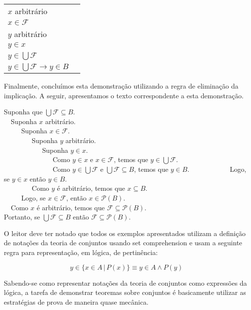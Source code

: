 \begin{Example}
\begin{flushleft}
\begin{tabular}{ll}
$x$ arbitrário & \\
$x\in\mathcal{F}$ & \\
$y$ arbitrário & \\
$y\in x$ & \\
$y\in\bigcup\mathcal{F}$ &\\
$y\in \bigcup \mathcal{F} \to y\in B$ & \\
\end{tabular}
\end{flushleft}
Finalmente, concluímos esta demonstração utilizando a regra de
eliminação da implicação. A seguir, apresentamos o texto
correspondente a esta demonstração.
\begin{flushleft}
Suponha que $\bigcup\mathcal{F}\subseteq B$.\\
\verb|  |Suponha $x$ arbitrário.\\
\verb|     |Suponha $x\in\mathcal{F}$.\\
\verb|        |Suponha $y$ arbitrário.\\
\verb|           |Suponha $y\in x$.\\
\verb|              |Como $y\in x$ e $x\in\mathcal{F}$, temos que
$y\in\bigcup\mathcal{F}$.\\
\verb|              |Como $y\in\bigcup\mathcal{F}$ e
$\bigcup\mathcal{F}\subseteq B$, temos que $y\in B$.
\verb|           |Logo, se $y\in x$ então $y\in B$.\\
\verb|        |Como $y$ é arbitrário, temos que $x\subseteq B$.\\
\verb|     |Logo, se $x\in\mathcal{F}$, então $x\in\mathcal{P}(B)$.\\
\verb|  |Como $x$ é arbitrário, temos que $\mathcal{F}\subseteq\mathcal{P}(B)$.\\
Portanto, se $\bigcup\mathcal{F}\subseteq B$ então
$\mathcal{F}\subseteq\mathcal{P}(B)$.
\end{flushleft}
\end{Example}

O leitor deve ter  notado que todos os exemplos apresentados utilizam
a definição de notações da teoria de conjuntos usando set
comprehension e usam a seguinte regra para representação, em lógica,
de pertinência:

\[ y \in\{x\in A \,|\, P(x) \} \equiv y \in A \land P(y) \]

Sabendo-se como representar notações da teoria de conjuntos como
expressões da lógica, a tarefa de demonstrar teoremas sobre conjuntos
é basicamente utilizar as estratégias de prova de maneira quase
mecânica.

